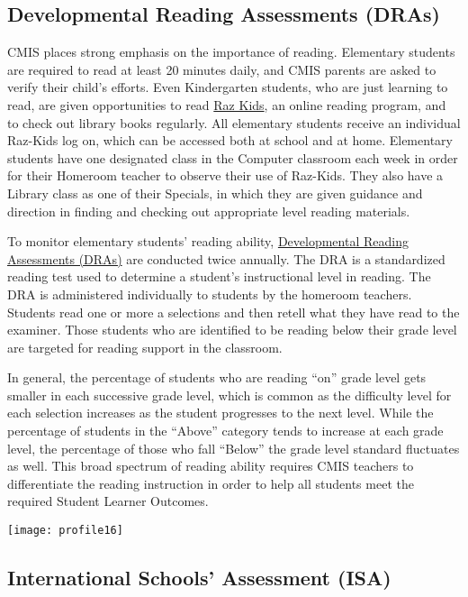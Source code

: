 \subsection{Developmental Reading Assessments (DRAs)}

CMIS places strong emphasis on the importance of reading.  Elementary students are required to read at least 20 minutes daily, and CMIS parents are asked to verify their child’s efforts.  Even Kindergarten students, who are just learning to read, are given opportunities to read \href{https://www.raz-kids.com/}{Raz Kids}, an online reading program, and to check out library books regularly.  All elementary students receive an individual Raz-Kids log on, which can be accessed both at school and at home.  Elementary students have one designated class in the Computer classroom each week in order for their Homeroom teacher to observe their use of Raz-Kids.  They also have a Library class as one of their Specials, in which they are given guidance and direction in finding and checking out appropriate level reading materials.  

To monitor elementary students’ reading ability, \href{https://drive.google.com/open?id=0ByVFfrm0zfolV29lcmM1WXVQOXc}{Developmental Reading Assessments (DRAs)} are conducted twice annually.  The DRA is a standardized reading test used to determine a student’s instructional level in reading. The DRA is administered individually to students by the homeroom teachers. Students read one or more a selections and then retell what they have read to the examiner. Those students who are identified to be reading below their grade level are targeted for reading support in the classroom. 

In general, the percentage of students who are reading “on” grade level gets smaller in each successive grade level, which is common as the difficulty level for each selection increases as the student progresses to the next level. While the percentage of students in the “Above” category tends to increase at each grade level, the percentage of those who fall “Below” the grade level standard fluctuates as well. This broad spectrum of reading ability requires CMIS teachers to differentiate the reading instruction in order to help all students meet the required Student Learner Outcomes.  

 
\texttt{[image: profile16]}

\subsection{International Schools’ Assessment (ISA)}

